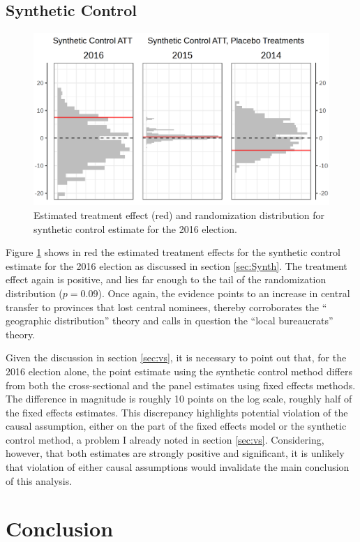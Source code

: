 \documentclass[12pt]{article}\usepackage[]{graphicx}\usepackage[]{color}
\newcommand{\1}{\mathbbm{1}}
\begin{document}
\subsection{Synthetic Control}

\begin{figure}[ht]
	\centering
	\includegraphics[width=.5\textwidth]{figure/SYP_Synth.png}
	\captionsetup{singlelinecheck=off}
	\caption[Estimated treatment effects for Synthetic Control]{Estimated treatment effect (red) and randomization distribution for synthetic control estimate for the 2016 election.}
	\label{fig:Synth}
\end{figure}

Figure \ref{fig:Synth} shows in red the estimated treatment effects for the synthetic control estimate for the 2016 election as discussed in section \ref{sec:Synth}. The treatment effect again is positive, and lies far enough to the tail of the randomization distribution ($p = 0.09$). Once again, the evidence points to an increase in central transfer to provinces that lost central nominees, thereby corroborates the `` geographic distribution'' theory and calls in question the ``local bureaucrats'' theory.

Given the discussion in section \ref{sec:vs}, it is necessary to point out that, for the 2016 election alone, the point estimate using the synthetic control method differs from both the cross-sectional and the panel estimates using fixed effects methods. The difference in magnitude is roughly 10 points on the log scale, roughly half of the fixed effects estimates. This discrepancy highlights potential violation of the causal assumption, either on the part of the fixed effects model or the synthetic control method, a problem I already noted in section \ref{sec:vs}. Considering, however, that both estimates are strongly positive and significant, it is unlikely that violation of either causal assumptions would invalidate the main conclusion of this analysis.

\section{Conclusion}
\label{sec:conclusion}
\end{document}

